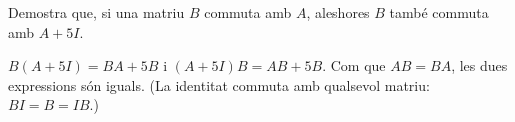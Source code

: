 \begin{apartats}
\begin{nomesllarg}
Demostra que, si una matriu $B$ commuta amb $A$, aleshores $B$ també commuta amb $A+5I$.

\begin{solucio}
$B(A+5I)=BA+5B$ i $(A+5I)B=AB+5B$. Com que $AB=BA$, les dues expressions són iguals. (La identitat
commuta amb qualsevol matriu: $BI=B=IB$.)
\end{solucio}
\end{nomesllarg}

\end{apartats}
